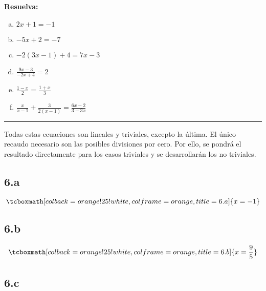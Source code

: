 \documentclass{article}
\begin{document}
\textbf{Resuelva:}

\begin{enumerate}[(a)]
\bfseries

\item $ 2x + 1 = -1 $

\item $ -5x + 2 = -7 $

\item $ -2(3x-1) + 4 = 7x -3 $

\item $ \frac{9x - 3}{-2x + 4} = 2 $

\item $ \frac{1-x}{2} = \frac{1 + x}{3} $

\item $ \frac{x}{x-1} + \frac{3}{2(x-1)} = \frac{6x-2}{3-3x} $

\end{enumerate}
\hrule

Todas estas ecuaciones son lineales y triviales, excepto la última. El único recaudo necesario son las posibles divisiones por cero. Por ello, se pondrá el resultado directamente para los casos triviales y se desarrollarán los no triviales.

\subsection*{6.a}
\label{subsec:6.a}

\begin{equation}
\tcboxmath[colback=orange!25!white,colframe=orange, title=6.a] { x = -1 }
\end{equation}

\subsection*{6.b}
\label{subsec:6.b}

\begin{equation}
\tcboxmath[colback=orange!25!white,colframe=orange, title=6.b] { x = \frac{9}{5} }
\end{equation}

\subsection*{6.c}
\label{subsec:6.c}
\end{document}

